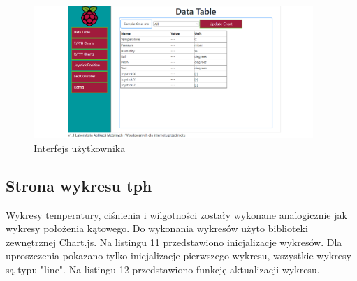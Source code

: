 \documentclass{article}
\begin{document}
				\begin{figure}[!h]
					\includegraphics[width=400px]{webUI_datatable}
					\caption{Interfejs użytkownika}
				\end{figure}
			\subsection{Strona wykresu tph}
				Wykresy temperatury, ciśnienia i wilgotności zostały wykonane analogicznie jak wykresy położenia kątowego. Do wykonania wykresów użyto biblioteki zewnętrznej Chart.js. Na listingu 11 przedstawiono inicjalizacje wykresów. Dla uproszczenia pokazano tylko inicjalizacje pierwszego wykresu, wszystkie wykresy są typu "line". Na listingu 12 przedstawiono funkcję aktualizacji wykresu.
\end{document}

